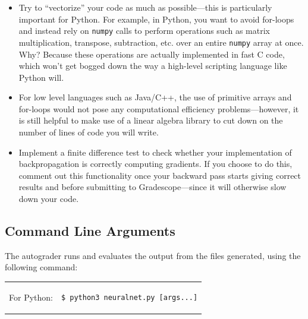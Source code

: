 \documentclass[11pt,addpoints,answers]{exam}
\begin{document}
\begin{itemize}
\item Try to ``vectorize'' your code as much as possible---this is particularly important for Python. For example, in Python, you want to avoid for-loops and instead rely on \lstinline{numpy} calls to perform operations such as matrix multiplication, transpose, subtraction, etc. over an entire \lstinline{numpy} array at once. Why? Because these operations are actually implemented in fast C code, which won't get bogged down the way a high-level scripting language like Python will.
\item For low level languages such as Java/C++, the use of primitive arrays and for-loops would not pose any computational efficiency problems---however, it is still helpful to make use of a linear algebra library to cut down on the number of lines of code you will write.
\item Implement a finite difference test to check whether your implementation of backpropagation is correctly computing gradients. If you choose to do this, comment out this functionality once your backward pass starts giving correct results and before submitting to Gradescope---since it will otherwise slow down your code.
\end{itemize}

\subsection{Command Line Arguments}
\label{sec:args}
The autograder runs and evaluates the output from the files generated, using the following command:

\begin{tabular}{ll}
For Python: &
\begin{lstlisting}[language=Shell]
$ python3 neuralnet.py [args...]
\end{lstlisting}
\\
For Java: &
\begin{lstlisting}[language=Shell]
$ javac -cp "./lib/ejml-v0.38-libs/*:./" neuralnet.java
$ java -cp "./lib/ejml-v0.38-libs/*:./" neuralnet [args...]
\end{lstlisting}
\\
For C++: &
\begin{lstlisting}[language=Shell]
$ g++ -g -std=c++11 -I./lib neuralnet.cpp; ./a.out [args...]
\end{lstlisting}
\end{tabular}
\end{document}
